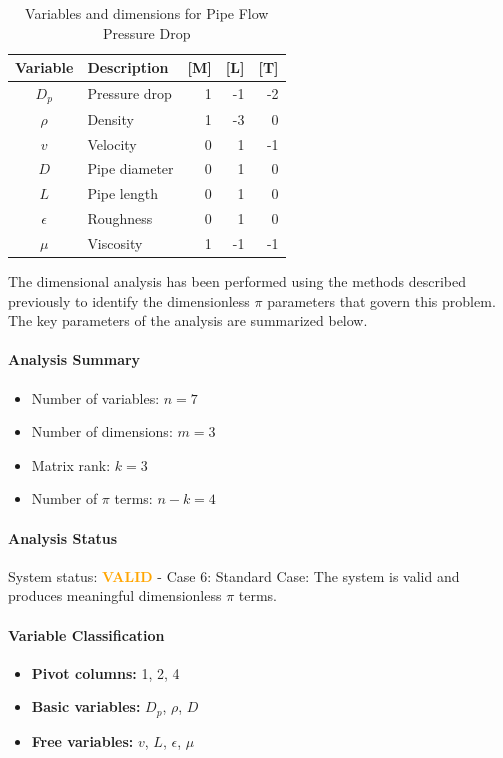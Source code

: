 \begin{table}[H]
\centering
\begin{tabular}{|c|l|r|r|r|}
\hline
\textbf{Variable} & \textbf{Description} & \textbf{[M]} & \textbf{[L]} & \textbf{[T]} \\
\hline
$D_p$ & Pressure drop & 1 & -1 & -2 \\
$\rho$ & Density & 1 & -3 & 0 \\
$v$ & Velocity & 0 & 1 & -1 \\
$D$ & Pipe diameter & 0 & 1 & 0 \\
$L$ & Pipe length & 0 & 1 & 0 \\
$\epsilon$ & Roughness & 0 & 1 & 0 \\
$\mu$ & Viscosity & 1 & -1 & -1 \\

\hline
\end{tabular}
\caption{Variables and dimensions for Pipe Flow Pressure Drop}
\end{table}

The dimensional analysis has been performed using the methods described previously to identify the dimensionless $\pi$ parameters that govern this problem. The key parameters of the analysis are summarized below.

\paragraph{Analysis Summary}
\begin{itemize}
\item Number of variables: $n = 7$
\item Number of dimensions: $m = 3$
\item Matrix rank: $k = 3$
\item Number of $\pi$ terms: $n - k = 4$
\end{itemize}

\paragraph{Analysis Status}
System status: \textcolor{orange}{\textbf{VALID}} - Case 6: Standard Case: The system is valid and produces meaningful dimensionless $\pi$ terms.


\paragraph{Variable Classification}
\begin{itemize}
\item \textbf{Pivot columns:} 1, 2, 4
\item \textbf{Basic variables:} $D_p$, $\rho$, $D$
\item \textbf{Free variables:} $v$, $L$, $\epsilon$, $\mu$
\end{itemize}

